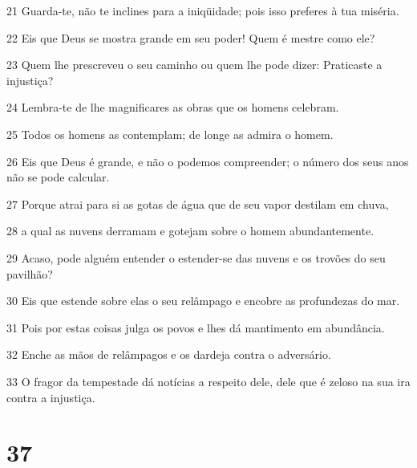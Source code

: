 \par 21 Guarda-te, não te inclines para a iniqüidade; pois isso preferes à tua miséria.
\par 22 Eis que Deus se mostra grande em seu poder! Quem é mestre como ele?
\par 23 Quem lhe prescreveu o seu caminho ou quem lhe pode dizer: Praticaste a injustiça?
\par 24 Lembra-te de lhe magnificares as obras que os homens celebram.
\par 25 Todos os homens as contemplam; de longe as admira o homem.
\par 26 Eis que Deus é grande, e não o podemos compreender; o número dos seus anos não se pode calcular.
\par 27 Porque atrai para si as gotas de água que de seu vapor destilam em chuva,
\par 28 a qual as nuvens derramam e gotejam sobre o homem abundantemente.
\par 29 Acaso, pode alguém entender o estender-se das nuvens e os trovões do seu pavilhão?
\par 30 Eis que estende sobre elas o seu relâmpago e encobre as profundezas do mar.
\par 31 Pois por estas coisas julga os povos e lhes dá mantimento em abundância.
\par 32 Enche as mãos de relâmpagos e os dardeja contra o adversário.
\par 33 O fragor da tempestade dá notícias a respeito dele, dele que é zeloso na sua ira contra a injustiça.

\chapter{37}

